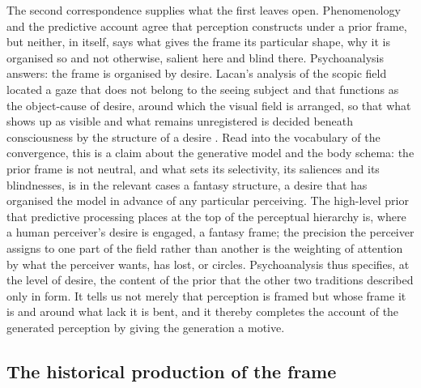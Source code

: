 The second correspondence supplies what the first leaves open. Phenomenology and the predictive account agree that perception constructs under a prior frame, but neither, in itself, says what gives the frame its particular shape, why it is organised so and not otherwise, salient here and blind there. Psychoanalysis answers: the frame is organised by desire. Lacan's analysis of the scopic field located a gaze that does not belong to the seeing subject and that functions as the object-cause of desire, around which the visual field is arranged, so that what shows up as visible and what remains unregistered is decided beneath consciousness by the structure of a desire \parencite{lacan1978}. Read into the vocabulary of the convergence, this is a claim about the generative model and the body schema: the prior frame is not neutral, and what sets its selectivity, its saliences and its blindnesses, is in the relevant cases a fantasy structure, a desire that has organised the model in advance of any particular perceiving. The high-level prior that predictive processing places at the top of the perceptual hierarchy is, where a human perceiver's desire is engaged, a fantasy frame; the precision the perceiver assigns to one part of the field rather than another is the weighting of attention by what the perceiver wants, has lost, or circles. Psychoanalysis thus specifies, at the level of desire, the content of the prior that the other two traditions described only in form. It tells us not merely that perception is framed but whose frame it is and around what lack it is bent, and it thereby completes the account of the generated perception by giving the generation a motive.

\subsection{The historical production of the frame}
\label{p23:sub:conv-political}

